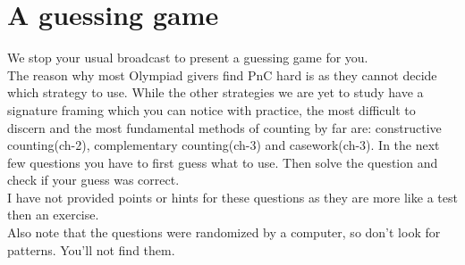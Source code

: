 \chapter{A guessing game}
We stop your usual broadcast to present a guessing game for you.\\
The reason why most Olympiad givers find PnC hard is as they cannot decide which strategy to use. While the other strategies we are yet to study have a signature framing which you can notice with practice, the most difficult to discern and the most fundamental methods of counting by far are: constructive counting(ch-2), complementary counting(ch-3) and casework(ch-3).  In the next few questions you have to first guess what to use. Then solve the question and check if your guess was correct. \\
I have not provided points or hints for these questions as they are more like a test then an exercise.\\
Also note that the questions were randomized by a computer, so don't look for patterns. You'll not find them.
